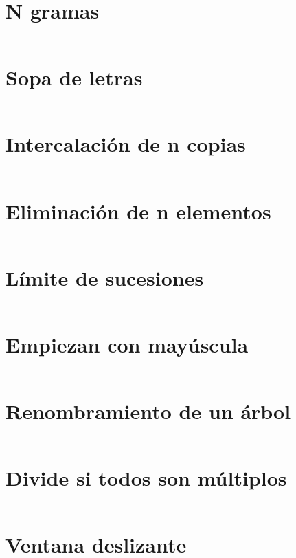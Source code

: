 \documentclass[a4paper,12pt,twoside]{book}
\newcommand{\ejercicio}[1]{\inputminted[firstline=7]{haskell}{../src/#1.hs}}
\begin{document}
\chapter{N gramas}
\ejercicio{N_gramas}

\chapter{Sopa de letras}
\ejercicio{Sopa_de_letras}

\chapter{Intercalación de n copias}
\ejercicio{Intercala_n_copias}

\chapter{Eliminación de n elementos}
\ejercicio{Elimina_n_elementos}


\chapter{Límite de sucesiones}
\ejercicio{Limites_de_sucesiones}

\chapter{Empiezan con mayúscula}
\ejercicio{Empiezan_con_mayuscula}

\chapter{Renombramiento de un árbol}
\ejercicio{Renombra_arbol}

\chapter{Divide si todos son múltiplos}
\ejercicio{Divide_si_todos_multiplos}

\chapter{Ventana deslizante}
\ejercicio{Ventana_deslizante}
\end{document}
